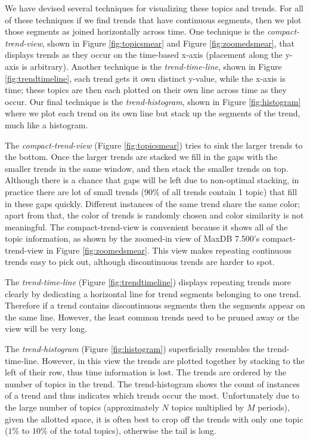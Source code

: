 \documentclass[times, 10pt,twocolumn]{article}
\newcommand{\shrinkit}{\vspace*{-.3em}}
\begin{document}
\shrinkit
{}
\shrinkit

We have devised several techniques for visualizing these topics and
trends.  For all of these techniques if we find trends that have
continuous segments, then we plot those segments as joined
horizontally across time. One technique is the \emph{compact-trend-view},
shown in Figure \ref{fig:topicsmear} and Figure \ref{fig:zoomedsmear},
that displays trends as they occur on the time-based x-axis
(placement along the y-axis is arbitrary).  Another technique is
the \emph{trend-time-line}, shown in Figure \ref{fig:trendtimeline},
each trend gets it own distinct y-value, while the x-axis is time;
these topics are then each plotted on their own line across time as
they occur. Our final technique is the \emph{trend-histogram}, shown in Figure
\ref{fig:histogram} where we plot each trend on its own line but stack
up the segments of the trend, much like a histogram.


The \emph{compact-trend-view} (Figure \ref{fig:topicsmear}) tries to
sink the larger trends to the bottom.  Once the larger trends are
stacked we fill in the gaps with the smaller trends in the same
window, and then stack the smaller trends on top.  Although there is a
chance that gaps will be left due to non-optimal stacking, in practice
there are lot of small trends (90\% of all trends contain 1 topic)
that fill in these gaps quickly.  Different instances of the same
trend share the same color; apart from that, the color of trends is
randomly chosen and color similarity is not meaningful.  The
compact-trend-view is convenient because it shows all of the topic
information, as shown by the zoomed-in view of MaxDB 7.500's
compact-trend-view in Figure \ref{fig:zoomedsmear}. This view makes
repeating continuous trends easy to pick out, although discontinuous
trends are harder to spot.

The \emph{trend-time-line} (Figure
\ref{fig:trendtimeline}) displays repeating trends more clearly by
dedicating a horizontal line for trend segments belonging to one
trend. Therefore if a trend contains discontinuous segments then
the segments appear on the same line.  However, the least common
trends need to be pruned away or the view will be very long.

The \emph{trend-histogram} (Figure \ref{fig:histogram}) superficially
resembles the trend-time-line.  However, in this view the trends are
plotted together by stacking to the left of their row, thus time
information is lost.  The trends are ordered by the number of topics
in the trend.  The trend-histogram shows the count of instances of a
trend and thus indicates which trends occur the most. Unfortunately
due to the large number of topics (approximately $N$ topics multiplied
by $M$ periods), given the allotted space, it is often best to crop
off the trends with only one topic ($1\%$ to $10\%$ of the total
topics), otherwise the tail is long.
\end{document}
